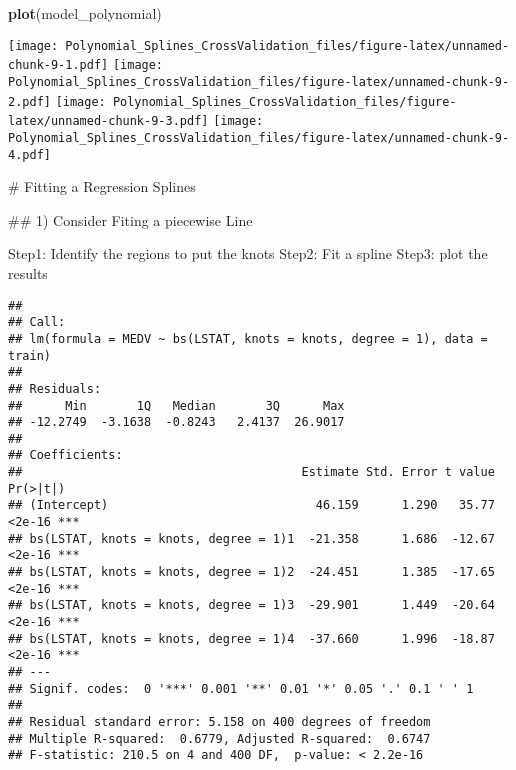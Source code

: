 \documentclass[
]{article}
\newenvironment{Shaded}{\begin{snugshade}}{\end{snugshade}}
\newcommand{\AttributeTok}[1]{\textcolor[rgb]{0.13,0.29,0.53}{#1}}
\newcommand{\CommentTok}[1]{\textcolor[rgb]{0.56,0.35,0.01}{\textit{#1}}}
\newcommand{\DecValTok}[1]{\textcolor[rgb]{0.00,0.00,0.81}{#1}}
\newcommand{\FloatTok}[1]{\textcolor[rgb]{0.00,0.00,0.81}{#1}}
\newcommand{\FunctionTok}[1]{\textcolor[rgb]{0.13,0.29,0.53}{\textbf{#1}}}
\newcommand{\NormalTok}[1]{#1}
\newcommand{\OtherTok}[1]{\textcolor[rgb]{0.56,0.35,0.01}{#1}}
\newcommand{\SpecialCharTok}[1]{\textcolor[rgb]{0.81,0.36,0.00}{\textbf{#1}}}
\begin{document}
\begin{Shaded}
\begin{Highlighting}[]
\FunctionTok{plot}\NormalTok{(model\_polynomial)}
\end{Highlighting}
\end{Shaded}

\texttt{[image: Polynomial\_Splines\_CrossValidation\_files/figure-latex/unnamed-chunk-9-1.pdf]}
\texttt{[image: Polynomial\_Splines\_CrossValidation\_files/figure-latex/unnamed-chunk-9-2.pdf]}
\texttt{[image: Polynomial\_Splines\_CrossValidation\_files/figure-latex/unnamed-chunk-9-3.pdf]}
\texttt{[image: Polynomial\_Splines\_CrossValidation\_files/figure-latex/unnamed-chunk-9-4.pdf]}

\# Fitting a Regression Splines

\#\# 1) Consider Fiting a piecewise Line

Step1: Identify the regions to put the knots Step2: Fit a spline Step3:
plot the results

\begin{Shaded}
\end{Shaded}

\begin{verbatim}
## 
## Call:
## lm(formula = MEDV ~ bs(LSTAT, knots = knots, degree = 1), data = train)
## 
## Residuals:
##      Min       1Q   Median       3Q      Max 
## -12.2749  -3.1638  -0.8243   2.4137  26.9017 
## 
## Coefficients:
##                                       Estimate Std. Error t value Pr(>|t|)    
## (Intercept)                             46.159      1.290   35.77   <2e-16 ***
## bs(LSTAT, knots = knots, degree = 1)1  -21.358      1.686  -12.67   <2e-16 ***
## bs(LSTAT, knots = knots, degree = 1)2  -24.451      1.385  -17.65   <2e-16 ***
## bs(LSTAT, knots = knots, degree = 1)3  -29.901      1.449  -20.64   <2e-16 ***
## bs(LSTAT, knots = knots, degree = 1)4  -37.660      1.996  -18.87   <2e-16 ***
## ---
## Signif. codes:  0 '***' 0.001 '**' 0.01 '*' 0.05 '.' 0.1 ' ' 1
## 
## Residual standard error: 5.158 on 400 degrees of freedom
## Multiple R-squared:  0.6779, Adjusted R-squared:  0.6747 
## F-statistic: 210.5 on 4 and 400 DF,  p-value: < 2.2e-16
\end{verbatim}
\end{document}
